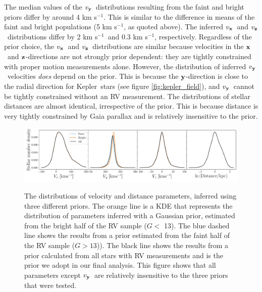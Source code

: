 \documentclass[]{aastex631}
\newcommand{\kepler}{{Kepler}}
\newcommand{\vx}{$v_{\bf x}$}
\newcommand{\vy}{$v_{\bf y}$}
\newcommand{\vz}{$v_{\bf z}$}
\newcommand{\x}{${\bf x}$}
\newcommand{\y}{${\bf y}$}
\newcommand{\z}{${\bf z}$}
\newcommand{\kms}{km s$^{-1}$}
\begin{document}
The median values of the \vy\ distributions resulting from the faint and
bright priors differ by around 4 \kms.
This is similar to the difference in means of the faint and bright populations
(5 \kms, as quoted above).
The inferred \vx\ and \vz\ distributions differ by 2 \kms\ and 0.3 \kms,
respectively.
Regardless of the prior choice, the \vx\ and \vz\ distributions are similar
because velocities in the \x\ and \z-directions are not strongly prior
dependent: they are tightly constrained with proper motion measurements alone.
However, the distribution of inferred \vy\ velocities {\it does} depend on the
prior.
This is because the \y-direction is close to the radial direction for \kepler\
stars (see figure \ref{fig:kepler_field}), and \vy\ cannot be tightly
constrained without an RV measurement.
The distributions of stellar distances are almost identical, irrespective of
the prior.
This is because distance is very tightly constrained by Gaia parallax and is
relatively insensitive to the prior.
\begin{figure}[ht!]
\caption{
The distributions of velocity and distance parameters, inferred using three
    different priors.
The orange line is a KDE that represents the distribution of parameters
    inferred with a Gaussian prior, estimated from the bright half of the RV
    sample ($G < $ 13).
The blue dashed line shows the results from a prior estimated from the faint
    half of the RV sample ($G > 13$)).
The black line shows the results from a prior calculated from all stars with
    RV measurements and is the prior we adopt in our final analysis.
    This figure shows that all parameters except \vy\ are relatively
    insensitive to the three priors that were tested.
    }
  \centering
    \includegraphics[width=1\textwidth]{prior_comparison}
\label{fig:prior_comparison}
\end{figure}

\end{document}
